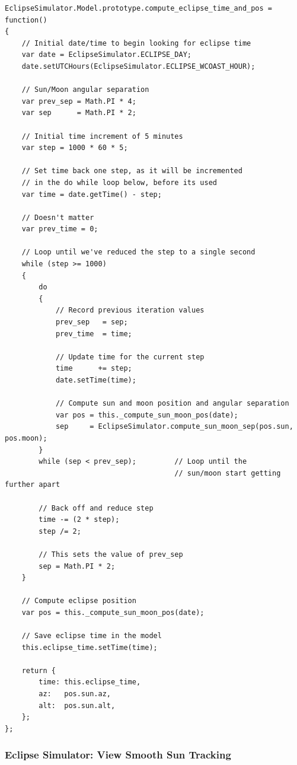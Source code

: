 \documentclass[10pt, onecolumn, draftclsnofoot, letterpaper, compsoc]{IEEEtran}
\begin{document}
\begin{verbatim}
EclipseSimulator.Model.prototype.compute_eclipse_time_and_pos = function()
{
    // Initial date/time to begin looking for eclipse time
    var date = EclipseSimulator.ECLIPSE_DAY;
    date.setUTCHours(EclipseSimulator.ECLIPSE_WCOAST_HOUR);

    // Sun/Moon angular separation
    var prev_sep = Math.PI * 4;
    var sep      = Math.PI * 2;

    // Initial time increment of 5 minutes
    var step = 1000 * 60 * 5;

    // Set time back one step, as it will be incremented
    // in the do while loop below, before its used
    var time = date.getTime() - step;

    // Doesn't matter
    var prev_time = 0;

    // Loop until we've reduced the step to a single second
    while (step >= 1000)
    {
        do
        {
            // Record previous iteration values
            prev_sep   = sep;
            prev_time  = time;

            // Update time for the current step
            time      += step;
            date.setTime(time);

            // Compute sun and moon position and angular separation
            var pos = this._compute_sun_moon_pos(date);
            sep     = EclipseSimulator.compute_sun_moon_sep(pos.sun, pos.moon);
        }
        while (sep < prev_sep);         // Loop until the
                                        // sun/moon start getting further apart

        // Back off and reduce step
        time -= (2 * step);
        step /= 2;

        // This sets the value of prev_sep
        sep = Math.PI * 2;
    }

    // Compute eclipse position
    var pos = this._compute_sun_moon_pos(date);

    // Save eclipse time in the model
    this.eclipse_time.setTime(time);

    return {
        time: this.eclipse_time,
        az:   pos.sun.az,
        alt:  pos.sun.alt,
    };
};
\end{verbatim}

\newpage
\subsubsection{Eclipse Simulator: View Smooth Sun Tracking}
\end{document}

